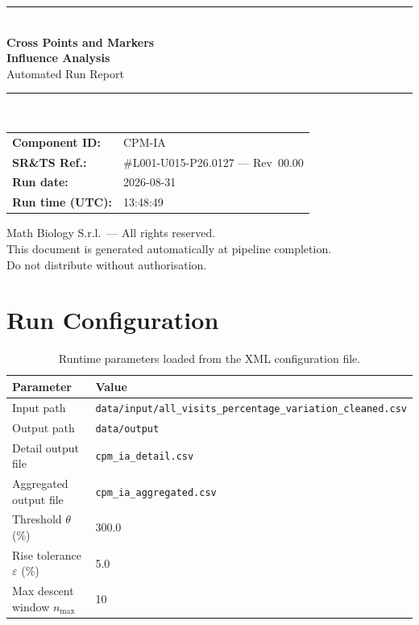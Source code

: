 \documentclass[a4paper,11pt]{article}
\begin{document}
\begin{titlepage}
\begin{center}
  \vspace*{1.8cm}
  {\color{dmaaccent}\rule{\linewidth}{1.5pt}}\\[0.6cm]
  {\LARGE\bfseries\color{dmaaccent}
    Cross Points and Markers\\[0.25cm]
    Influence Analysis}\\[0.4cm]
  {\Large Automated Run Report}\\[0.3cm]
  {\color{dmaaccent}\rule{\linewidth}{1.5pt}}\\[2cm]

  \begin{tabular}{ll}
    \textbf{Component ID:}   & CPM-IA \\[0.3cm]
    \textbf{SR\&TS Ref.:}    & \#L001-U015-P26.0127 --- Rev~00.00 \\[0.3cm]
    \textbf{Run date:}       & 2026-08-31 \\[0.3cm]
    \textbf{Run time (UTC):} & 13:48:49 \\
  \end{tabular}

  \vfill
  {\color{dmagray}\small
    Math Biology S.r.l.\ --- All rights reserved.\\
    This document is generated automatically at pipeline completion.\\
    Do not distribute without authorisation.}
\end{center}
\end{titlepage}

\tableofcontents
\clearpage

\section{Run Configuration}

\begin{table}[h!]
\centering
\small
\caption{Runtime parameters loaded from the XML configuration file.}
\begin{tabular}{ll}
\toprule
\textbf{Parameter} & \textbf{Value} \\
\midrule
Input path                        & \texttt{data/input/all\_visits\_percentage\_variation\_cleaned.csv} \\
Output path                       & \texttt{data/output} \\
Detail output file                & \texttt{cpm\_ia\_detail.csv} \\
Aggregated output file            & \texttt{cpm\_ia\_aggregated.csv} \\
Threshold $\theta$ (\%)           & 300.0 \\
Rise tolerance $\varepsilon$ (\%) & 5.0 \\
Max descent window $n_{\max}$     & 10 \\
\bottomrule
\end{tabular}
\end{table}
\end{document}
